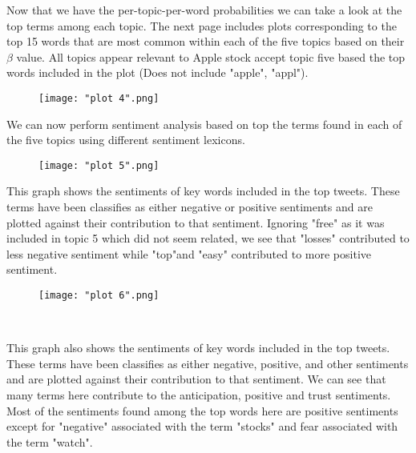 \documentclass[11pt, oneside]{article}   	%
\begin{document}
\FloatBarrier 

Now that we have the per-topic-per-word probabilities we can take a look at the top terms among each topic. The next page includes plots corresponding to the top 15 words that are most common within each of the five topics based on their $\beta$ value. All topics appear relevant to Apple stock accept topic five based the top words included in the plot (Does not include "apple", "appl"). 

\begin{figure}[!h] %
   \centering
   \texttt{[image: "plot 4".png]} 
\end{figure}

\FloatBarrier

We can now perform sentiment analysis based on top the terms found in each of the five topics using different sentiment lexicons.

\begin{figure}[! h] %
   \centering
   \texttt{[image: "plot 5".png]} 
\end{figure}

\FloatBarrier

This graph shows the sentiments of key words included in the top tweets. These terms have been classifies as either negative or positive sentiments and are plotted against their contribution to that sentiment. Ignoring "free" as it was included in topic 5 which did not seem related, we see that "losses" contributed to less negative sentiment while "top"and "easy" contributed to more positive sentiment.

\begin{figure}[! h] %
   \centering
   \texttt{[image: "plot 6".png]} 
\end{figure}\

\FloatBarrier

This graph also shows the sentiments of key words included in the top tweets. These terms have been classifies as either negative, positive, and other sentiments and are plotted against their contribution to that sentiment. We can see that many terms here contribute to the anticipation, positive and trust sentiments. Most of the sentiments found among the top words here are positive sentiments except for "negative" associated with the term "stocks" and fear associated with the term "watch". 
\end{document}
